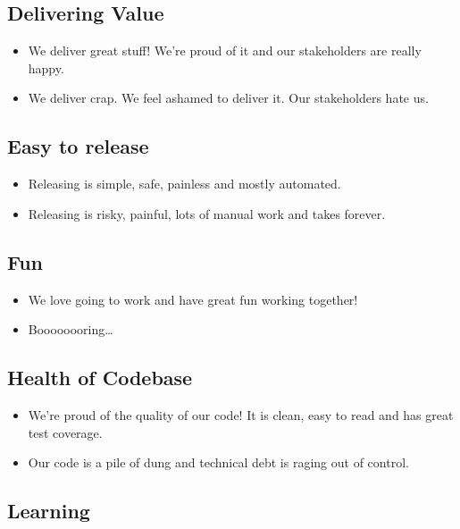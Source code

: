 \documentclass[a4paper]{article}
\begin{document}
\subsection{Delivering Value}

\begin{itemize}
\item We deliver great stuff! We're proud of it and our stakeholders are really happy.
\item We deliver crap. We feel ashamed to deliver it. Our stakeholders hate us.
\end{itemize}

\subsection{Easy to release}

\begin{itemize}
\item Releasing is simple, safe, painless and mostly automated.
\item Releasing is risky, painful, lots of manual work and takes forever.
\end{itemize}

\subsection{Fun}

\begin{itemize}
\item We love going to work and have great fun working together!
\item Boooooooring\ldots{}
\end{itemize}

\subsection{Health of Codebase}

\begin{itemize}
\item We're proud of the quality of our code! It is clean, easy to read and has great test coverage.
\item Our code is a pile of dung and technical debt is raging out of control.
\end{itemize}

\subsection{Learning}
\end{document}
